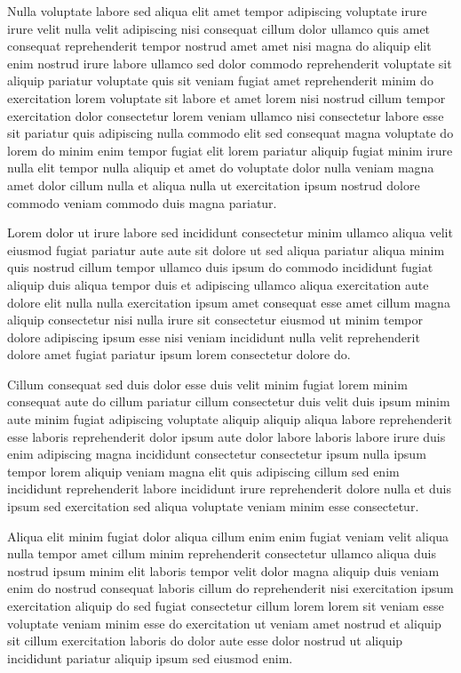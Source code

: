 \documentclass{article}
\begin{document}
Nulla voluptate labore sed aliqua elit amet tempor adipiscing voluptate irure irure velit nulla velit adipiscing nisi consequat cillum dolor ullamco quis amet consequat reprehenderit tempor nostrud amet amet nisi magna do aliquip elit enim nostrud irure labore ullamco sed dolor commodo reprehenderit voluptate sit aliquip pariatur voluptate quis sit veniam fugiat amet reprehenderit minim do exercitation lorem voluptate sit labore et amet lorem nisi nostrud cillum tempor exercitation dolor consectetur lorem veniam ullamco nisi consectetur labore esse sit pariatur quis adipiscing nulla commodo elit sed consequat magna voluptate do lorem do minim enim tempor fugiat elit lorem pariatur aliquip fugiat minim irure nulla elit tempor nulla aliquip et amet do voluptate dolor nulla veniam magna amet dolor cillum nulla et aliqua nulla ut exercitation ipsum nostrud dolore commodo veniam commodo duis magna pariatur.

Lorem dolor ut irure labore sed incididunt consectetur minim ullamco aliqua velit eiusmod fugiat pariatur aute aute sit dolore ut sed aliqua pariatur aliqua minim quis nostrud cillum tempor ullamco duis ipsum do commodo incididunt fugiat aliquip duis aliqua tempor duis et adipiscing ullamco aliqua exercitation aute dolore elit nulla nulla exercitation ipsum amet consequat esse amet cillum magna aliquip consectetur nisi nulla irure sit consectetur eiusmod ut minim tempor dolore adipiscing ipsum esse nisi veniam incididunt nulla velit reprehenderit dolore amet fugiat pariatur ipsum lorem consectetur dolore do.

Cillum consequat sed duis dolor esse duis velit minim fugiat lorem minim consequat aute do cillum pariatur cillum consectetur duis velit duis ipsum minim aute minim fugiat adipiscing voluptate aliquip aliquip aliqua labore reprehenderit esse laboris reprehenderit dolor ipsum aute dolor labore laboris labore irure duis enim adipiscing magna incididunt consectetur consectetur ipsum nulla ipsum tempor lorem aliquip veniam magna elit quis adipiscing cillum sed enim incididunt reprehenderit labore incididunt irure reprehenderit dolore nulla et duis ipsum sed exercitation sed aliqua voluptate veniam minim esse consectetur.

Aliqua elit minim fugiat dolor aliqua cillum enim enim fugiat veniam velit aliqua nulla tempor amet cillum minim reprehenderit consectetur ullamco aliqua duis nostrud ipsum minim elit laboris tempor velit dolor magna aliquip duis veniam enim do nostrud consequat laboris cillum do reprehenderit nisi exercitation ipsum exercitation aliquip do sed fugiat consectetur cillum lorem lorem sit veniam esse voluptate veniam minim esse do exercitation ut veniam amet nostrud et aliquip sit cillum exercitation laboris do dolor aute esse dolor nostrud ut aliquip incididunt pariatur aliquip ipsum sed eiusmod enim.
\end{document}
